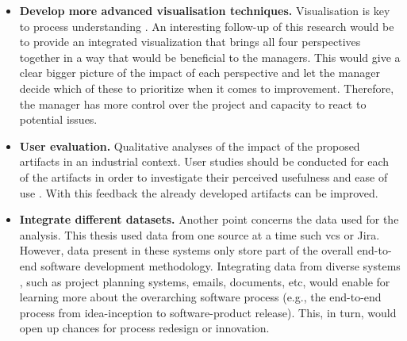 \begin{itemize}
	\item {\bfseries Develop more advanced visualisation techniques.}
	Visualisation is key to process understanding \citep{DBLP:journals/corr/abs-2202-07941}. An interesting follow-up of this research would be to provide an integrated visualization that brings all four perspectives together in a way that would be beneficial to the managers. This would give a clear bigger picture of the impact of each perspective and let the manager decide which of these to prioritize when it comes to improvement. Therefore, the manager has more control over the project and capacity to react to potential issues. 
	
	\item{\bfseries User evaluation.}
	Qualitative analyses of the impact of the proposed artifacts in an industrial context. User studies should be conducted for each of the artifacts in order to investigate their perceived usefulness and ease of use \citep{DBLP:journals/misq/VenkateshMDD03}. With this feedback the already developed artifacts can be improved. 
	
	
	\item{\bfseries Integrate different datasets.}
	Another point concerns the data used for the analysis. This thesis used data from one source at a time such \gls{vcs} or Jira. However, data present in these systems only store part of the overall end-to-end software development methodology. Integrating data from diverse systems \citep{DBLP:conf/icse/TrautschTHLG20}, such as project planning systems, emails, documents, etc, would enable for learning more about the overarching software process (e.g., the end-to-end process from idea-inception to software-product release). This, in turn, would open up chances for process redesign or innovation. 
	

\end{itemize}
